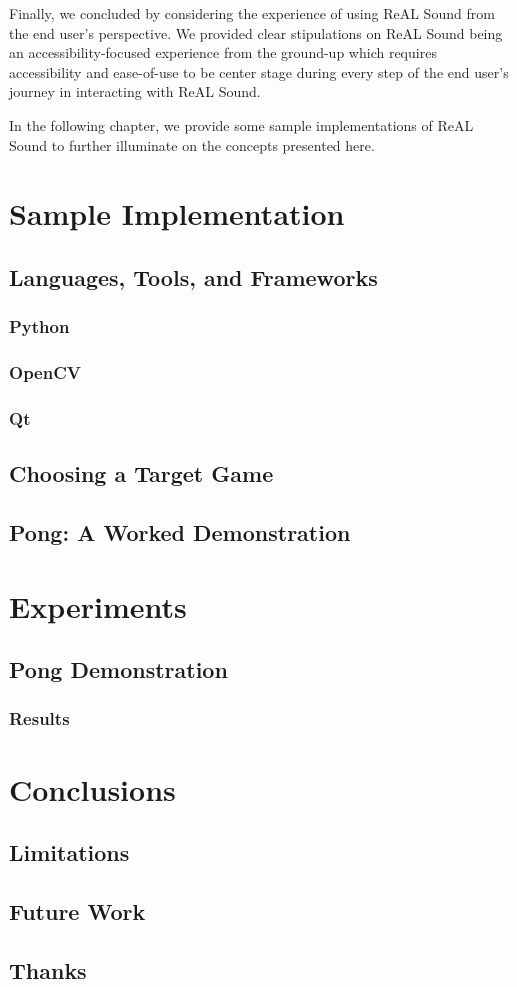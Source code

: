 \documentclass{report}
\newcommand{\rs}{ReAL Sound\xspace}
\begin{document}
Finally, we concluded by considering the experience of using \rs from the end user's perspective. We provided clear stipulations on \rs being an accessibility-focused experience from the ground-up which requires accessibility and ease-of-use to be center stage during every step of the end user's journey in interacting with \rs. 

In the following chapter, we provide some sample implementations of \rs to further illuminate on the concepts presented here.




\chapter{Sample Implementation}
\section{Languages, Tools, and Frameworks}
    \subsection{Python}
    \subsection{OpenCV}
    \subsection{Qt}
\section{Choosing a Target Game}
\section{Pong: A Worked Demonstration}


\chapter{Experiments} 
\section{Pong Demonstration}
\subsection{Results}

\chapter{Conclusions}
\section{Limitations}
\section{Future Work}

\section{Thanks}

% 
\printbibliography
\end{document}
